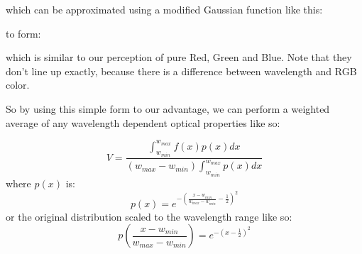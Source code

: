 \documentclass[12pt,letterpaper]{article}
\begin{document}
which can be approximated using a modified Gaussian function like this:
\begin{center}
	\pgfplotsset{width=15em}
\end{center}

to form:

\begin{center}
	\pgfplotsset{width=30em, height=15em}
\end{center}
which is similar to our perception of pure Red, Green and Blue. Note that they don't line up exactly, 
because there is a difference between wavelength and RGB color.

So by using this simple form to our advantage, we can perform a weighted average of 
any wavelength dependent optical properties like so:

$$
V = \frac{\int_{w_{min}}^{w_{max}}{f\left(x\right)p\left(x\right)dx}}
     {\left( w_{max} - w_{min} \right) \int_{w_{min}}^{w_{max}}{p\left(x\right)dx}}
$$
where $p(x)$ is:
$$
p(x) = e^{-{\left( \frac{x-w_{min}}{w_{max}-w_{min}} - \frac{1}{2} \right)}^2}
$$
or the original distribution scaled to the wavelength range like so:
$$
p(\frac{x-w_{min}}{w_{max}-w_{min}}) = e^{-{\left( x - \frac{1}{2} \right)}^2}
$$
\end{document}
